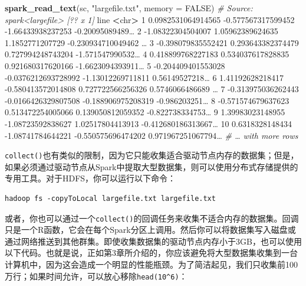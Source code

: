 \documentclass[
]{article}
\newenvironment{Shaded}{\begin{snugshade}}{\end{snugshade}}
\newcommand{\CommentTok}[1]{\textcolor[rgb]{0.56,0.35,0.01}{\textit{#1}}}
\newcommand{\DataTypeTok}[1]{\textcolor[rgb]{0.13,0.29,0.53}{#1}}
\newcommand{\DecValTok}[1]{\textcolor[rgb]{0.00,0.00,0.81}{#1}}
\newcommand{\FloatTok}[1]{\textcolor[rgb]{0.00,0.00,0.81}{#1}}
\newcommand{\KeywordTok}[1]{\textcolor[rgb]{0.13,0.29,0.53}{\textbf{#1}}}
\newcommand{\NormalTok}[1]{#1}
\newcommand{\OperatorTok}[1]{\textcolor[rgb]{0.81,0.36,0.00}{\textbf{#1}}}
\newcommand{\OtherTok}[1]{\textcolor[rgb]{0.56,0.35,0.01}{#1}}
\newcommand{\StringTok}[1]{\textcolor[rgb]{0.31,0.60,0.02}{#1}}
\begin{document}
\begin{Shaded}
\begin{Highlighting}[]
\KeywordTok{spark_read_text}\NormalTok{(sc, }\StringTok{"largefile.txt"}\NormalTok{, }\DataTypeTok{memory =} \OtherTok{FALSE}\NormalTok{)}
\CommentTok{# Source: spark<largefile> [?? x 1]}
\NormalTok{ line}
 \OperatorTok{<}\NormalTok{chr}\OperatorTok{>}
\StringTok{ }\DecValTok{1} \FloatTok{0.0982531064914565} \FloatTok{-0.577567317599452} \FloatTok{-1.66433938237253} \FloatTok{-0.20095089489}\NormalTok{…}
 \DecValTok{2} \FloatTok{-1.08322304504007} \FloatTok{1.05962389624635} \FloatTok{1.1852771207729} \FloatTok{-0.230934710049462}\NormalTok{ …}
 \DecValTok{3} \FloatTok{-0.398079835552421} \FloatTok{0.293643382374479} \FloatTok{0.727994248743204} \FloatTok{-1.571547990532}\NormalTok{…}
 \DecValTok{4} \FloatTok{0.418899768227183} \FloatTok{0.534037617828835} \FloatTok{0.921680317620166} \FloatTok{-1.6623094393911}\NormalTok{…}
 \DecValTok{5} \FloatTok{-0.204409401553028} \FloatTok{-0.0376212693728992} \FloatTok{-1.13012269711811} \FloatTok{0.56149527218}\NormalTok{…}
 \DecValTok{6} \FloatTok{1.41192628218417} \FloatTok{-0.580413572014808} \FloatTok{0.727722566256326} \FloatTok{0.5746066486689}\NormalTok{ …}
 \DecValTok{7} \FloatTok{-0.313975036262443} \FloatTok{-0.0166426329807508} \FloatTok{-0.188906975208319} \FloatTok{-0.986203251}\NormalTok{…}
 \DecValTok{8} \FloatTok{-0.571574679637623} \FloatTok{0.513472254005066} \FloatTok{0.139050812059352} \FloatTok{-0.822738334753}\NormalTok{…}
 \DecValTok{9} \FloatTok{1.39983023148955} \FloatTok{-1.08723592838627} \FloatTok{1.02517804413913} \FloatTok{-0.412680186313667}\NormalTok{…}
\DecValTok{10} \FloatTok{0.6318328148434} \FloatTok{-1.08741784644221} \FloatTok{-0.550575696474202} \FloatTok{0.971967251067794}\NormalTok{…}
\CommentTok{# … with more rows}
\end{Highlighting}
\end{Shaded}

\texttt{collect()}也有类似的限制，因为它只能收集适合驱动节点内存的数据集；但是，如果必须通过驱动节点从Spark中提取大型数据集，则可以使用分布式存储提供的专用工具。对于HDFS，你可以运行以下命令：

\begin{verbatim}
hadoop fs -copyToLocal largefile.txt largefile.txt
\end{verbatim}

或者，你也可以通过一个\texttt{collect()}的回调任务来收集不适合内存的数据集。回调只是一个R函数，它会在每个Spark分区上调用。然后你可以将数据集写入磁盘或通过网络推送到其他群集。即使收集数据集的驱动节点内存小于3GB，也可以使用以下代码。也就是说，正如第3章所介绍的，你应该避免将大型数据集收集到一台计算机中，因为这会造成一个明显的性能瓶颈。为了简洁起见，我们只收集前100万行；如果时间允许，可以放心移除\texttt{head(10\^{}6)}：
\end{document}
